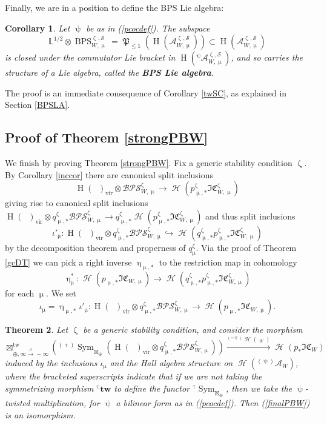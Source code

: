 \documentclass[a4paper,10pt]{amsart}
\renewcommand{\zeta}{\upzeta}
\renewcommand{\psi}{\uppsi}
\renewcommand{\tau}{\uptau}
\renewcommand{\mu}{\upmu}
\renewcommand{\eta}{\upeta}
\newtheorem{theorem}{Theorem}[section]
\newtheorem{corollary}[theorem]{Corollary}
\DeclareMathOperator{\BC}{B\mathbb{C}^*}
\DeclareMathOperator{\Pf}{\mathfrak{P}}
\newcommand{\LL}{\mathbb{L}}
\newcommand{\SP}{\mathcal{S}}
\newcommand{\ICSt}{\mathfrak{IC}}
\newcommand{\DTS}{\mathcal{BPS}}
\DeclareMathOperator{\tw}{tw}
\DeclareMathOperator{\ms}{\tilde{\ast}}
\DeclareMathOperator{\DT}{BPS}
\DeclareMathOperator{\Sym}{Sym}
\DeclareMathOperator{\vir}{vir}
\DeclareMathOperator{\Ho}{\mathcal{H}}
\DeclareMathOperator{\HO}{H}
\begin{document}
Finally, we are in a position to define the BPS Lie algebra:
\begin{corollary}
Let $\psi$ be as in (\ref{pcocdef}).  The subspace 
\[
\LL^{1/2}\otimes \DT^{\zeta,\SP}_{W,\mu}=\Pf_{\leq 1}\left(\HO(\mathcal{A}^{\zeta,\SP}_{W,\mu})\right)\subset \HO(\mathcal{A}^{\zeta,\SP}_{W,\mu})
\]
is closed under the commutator Lie bracket in $\HO(^{\psi}\!\mathcal{A}^{\zeta,\SP}_{W,\mu})$, and so carries the structure of a Lie algebra, called the \textbf{BPS Lie algebra}.
\end{corollary}
The proof is an immediate consequence of Corollary \ref{twSC}, as explained in Section \ref{BPSLA}.
\subsection{Proof of Theorem \ref{strongPBW}}
\label{CWCF}
We finish by proving Theorem \ref{strongPBW}.  Fix a generic stability condition $\zeta$.  By Corollary \ref{inccor} there are canonical split inclusions 
\[
\HO(\BC )_{\vir}\otimes \DTS^{\zeta}_{W,\mu}\rightarrow \Ho\left(p_{\mu,*}^{\zeta}\ICSt_{W,\mu}^{\zeta}\right)
\]
giving rise to canonical split inclusions $\HO(\BC )_{\vir}\otimes q^{\zeta}_{\mu,*}\DTS^{\zeta}_{W,\mu}\rightarrow q_{\mu,*}^{\zeta}\Ho\left(p^{\zeta}_{\mu,*}\ICSt_{W,\mu}^{\zeta}\right)$ and thus split inclusions
\[
\iota'_{\mu}\colon \HO(\BC )_{\vir}\otimes q^{\zeta}_{\mu,*}\DTS_{W,\mu}^{\zeta}\hookrightarrow \Ho\left(q^{\zeta}_{\mu,*}p^{\zeta}_{\mu,*}\ICSt^{\zeta}_{W,\mu}\right)
\]
by the decomposition theorem and properness of $q^{\zeta}_{\mu}$.  Via the proof of Theorem \ref{gcDT} we can pick a right inverse $\eta_{\mu,*}$ to the restriction map in cohomology 
\[
\eta_{\mu}^*\colon\Ho\left(p_{\mu,*}\ICSt_{W,\mu}\right)\rightarrow\Ho\left(q^{\zeta}_{\mu,*}p^{\zeta}_{\mu,*}\ICSt^{\zeta}_{W,\mu}\right)
\]
for each $\mu$.  We set 
\[
\iota_{\mu}=\eta_{\mu,*}\iota'_{\mu}\colon \HO(\BC )_{\vir}\otimes q^{\zeta}_{\mu,*}\DTS_{W,\mu}^{\zeta} \rightarrow \Ho\left(p_{\mu,*}\ICSt_{W,\mu}\right).
\]
\begin{theorem}
\label{sPBW}
Let $\zeta$ be a generic stability condition, and consider the morphism
\begin{equation}
\label{finalPBW}
\boxtimes_{\oplus,\infty \xrightarrow{\mu}-\infty}^{\tw} \left({}^{(\tau)}\!\Sym_{\boxtimes_{\oplus}}\left(\HO(\BC )_{\vir}\otimes q_{\mu,*}^{\zeta}\DTS_{W,\mu}^{\zeta}\right)\right)\xrightarrow{^{(\neg\psi)}\! \Ho(\ms_W)} \Ho\left(p_*\ICSt_W\right)
\end{equation}
induced by the inclusions $\iota_{\mu}$ and the Hall algebra structure on $\Ho({}^{(\psi)}\!\!\mathcal{A}_W)$, where the bracketed superscripts indicate that if we are not taking the symmetrizing morphism ${}^{\tau}\mathbf{tw}$ to define the functor ${}^{\tau}\!\Sym_{\boxtimes_{\oplus}}$, then we take the $\psi$-twisted multiplication, for $\psi$ a bilinear form as in (\ref{pcocdef}).  Then (\ref{finalPBW}) is an isomorphism.
\end{theorem}
\end{document}
